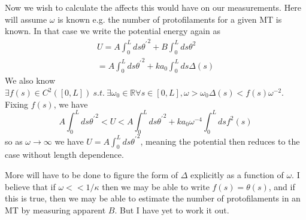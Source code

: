 \documentclass{article}
\theoremstyle{exampstyle} \newtheorem*{remark}{Remark}
\newcommand{\1}{\mathds{1}}
\begin{document}
Now we wish to calculate the affects this would have on our measurements. Here will assume $\omega$ is known e.g. the number of protofilaments for a given MT is known. In that case we write the potential energy again as 
\begin{align*}
U=A\int_0^L ds {\theta^\prime}^2 +B\int_0^L ds \theta^2 \\
=A\int_0^L ds {\theta^\prime}^2 +ka_0\int_0^L ds \Delta (s)
\end{align*}  
We also know $ \exists f(s)\in C^2([0,L])\ s.t.\ \exists \omega_0\in\mathbb{R} \forall s\in [0,L],\omega>\omega_0 \Delta(s)<f(s)\omega^{-2} $. Fixing $f(s)$, we have
$$ A\int_0^L ds {\theta^\prime}^2<U<A\int_0^L ds {\theta^\prime}^2 +ka_0\omega^{-4}\int_0^L ds f^2(s) $$ 
so as $\omega\to \infty$ we have $ U=A\int_0^L ds {\theta^\prime}^2 $, meaning the potential then reduces to the case without length dependence. 

More will have to be done to figure the form of $\Delta$ explicitly as a function of $\omega$. I believe that if $ \omega<<1/\kappa $ then we may be able to write $f(s)=\theta(s)$, and if this is true, then we may be able to estimate the number of protofilaments in an MT by measuring apparent $B$. But I have yet to work it out.   
\end{document}
